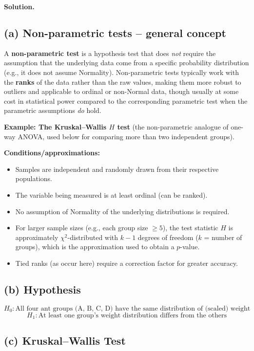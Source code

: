\documentclass[11pt]{article}
\newcommand{\soln}{\par\noindent\textcolor{acolor}{\textbf{Solution.}}\quad}
\begin{document}
\soln

\subsection*{(a) Non-parametric tests -- general concept}
A \textbf{non-parametric test} is a hypothesis test that does \emph{not} require the assumption that the underlying data come from a specific probability distribution (e.g., it does not assume Normality). Non-parametric tests typically work with the \textbf{ranks} of the data rather than the raw values, making them more robust to outliers and applicable to ordinal or non-Normal data, though usually at some cost in statistical power compared to the corresponding parametric test when the parametric assumptions \emph{do} hold.

\textbf{Example: The Kruskal--Wallis $H$ test} (the non-parametric analogue of one-way ANOVA, used below for comparing more than two independent groups).

\textbf{Conditions/approximations:}
\begin{itemize}
\item Samples are independent and randomly drawn from their respective populations.
\item The variable being measured is at least ordinal (can be ranked).
\item No assumption of Normality of the underlying distributions is required.
\item For larger sample sizes (e.g., each group size $\ge 5$), the test statistic $H$ is approximately $\chi^2$-distributed with $k-1$ degrees of freedom ($k$ = number of groups), which is the approximation used to obtain a $p$-value.
\item Tied ranks (as occur here) require a correction factor for greater accuracy.
\end{itemize}

\subsection*{(b) Hypothesis}
\[
H_0: \text{All four ant groups (A, B, C, D) have the same distribution of (scaled) weight}
\]
\[
H_1: \text{At least one group's weight distribution differs from the others}
\]

\subsection*{(c) Kruskal--Wallis Test}
\end{document}
